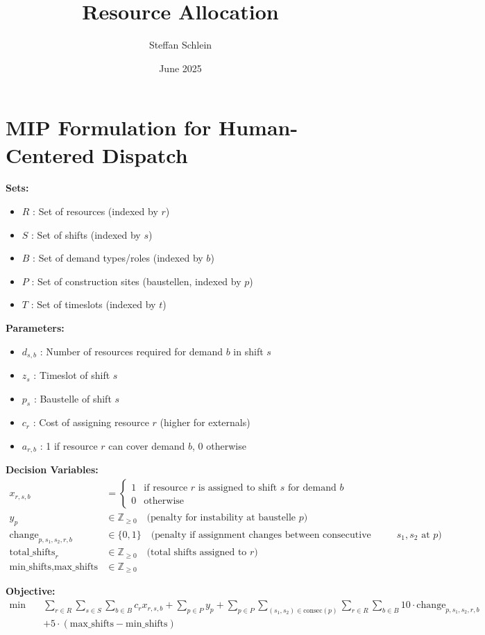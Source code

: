 \documentclass{article}
\title{Resource Allocation}
\author{Steffan Schlein}
\date{June 2025}
\begin{document}
\section*{MIP Formulation for Human-Centered Dispatch}

\textbf{Sets:}
\begin{itemize}
    \item $R$ : Set of resources (indexed by $r$)
    \item $S$ : Set of shifts (indexed by $s$)
    \item $B$ : Set of demand types/roles (indexed by $b$)
    \item $P$ : Set of construction sites (baustellen, indexed by $p$)
    \item $T$ : Set of timeslots (indexed by $t$)
\end{itemize}

\textbf{Parameters:}
\begin{itemize}
    \item $d_{s,b}$ : Number of resources required for demand $b$ in shift $s$
    \item $z_s$ : Timeslot of shift $s$
    \item $p_s$ : Baustelle of shift $s$
    \item $c_r$ : Cost of assigning resource $r$ (higher for externals)
    \item $a_{r,b}$ : 1 if resource $r$ can cover demand $b$, 0 otherwise
\end{itemize}

\textbf{Decision Variables:}
\begin{align*}
    x_{r,s,b} &=
    \begin{cases}
        1 & \text{if resource $r$ is assigned to shift $s$ for demand $b$} \\
        0 & \text{otherwise}
    \end{cases} \\
    y_p &\in \mathbb{Z}_{\geq 0} \quad \text{(penalty for instability at baustelle $p$)} \\
    \text{change}_{p,s_1,s_2,r,b} &\in \{0,1\} \quad \text{(penalty if assignment changes between consecutive shifts $s_1,s_2$ at $p$)} \\
    \text{total\_shifts}_r &\in \mathbb{Z}_{\geq 0} \quad \text{(total shifts assigned to $r$)} \\
    \text{min\_shifts}, \text{max\_shifts} &\in \mathbb{Z}_{\geq 0}
\end{align*}

\textbf{Objective:}
\begin{align*}
    \min \quad & \sum_{r \in R} \sum_{s \in S} \sum_{b \in B} c_r x_{r,s,b}
    + \sum_{p \in P} y_p
    + \sum_{p \in P} \sum_{(s_1,s_2) \in \text{consec}(p)} \sum_{r \in R} \sum_{b \in B} 10 \cdot \text{change}_{p,s_1,s_2,r,b} \\
    &+ 5 \cdot (\text{max\_shifts} - \text{min\_shifts})
\end{align*}
\end{document}

